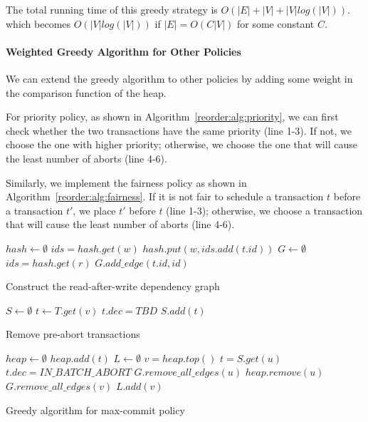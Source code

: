 The total running time of this greedy strategy is $O(|E|+|V|+|V|log(|V|))$. 
which becomes $O(|V|log(|V|))$ if $|E|=O(C|V|)$ for some constant $C$.

\paragraph{Weighted Greedy Algorithm for Other Policies}
We can extend the greedy algorithm to other policies by adding some weight in the comparison function of the heap.

For priority policy, as shown in Algorithm~\ref{reorder:alg:priority}, we can first check whether the two transactions have the same priority (line 1-3). 
If not, we choose the one with higher priority; otherwise, we choose the one that will cause the least number of aborts (line 4-6).

Similarly, we implement the fairness policy as shown in Algorithm~\ref{reorder:alg:fairness}. 
If it is not fair to schedule a transaction $t$ before a transaction $t'$, we place $t'$ before $t$ (line 1-3); otherwise, we choose a transaction that will cause the least number of aborts (line 4-6).

\begin{algorithm}
$hash \gets \emptyset$\;
 {
	 {
		$ids = hash.get(w)$\;
		$hash.put(w, ids.add(t.id))$\;
	}
}
$G\gets \emptyset$\;
 {
	 {
		$ids = hash.get(r)$\;
		 {
			$G.add\_edge(t.id, id)$\;
		}
	}
}
\;
\caption{Construct the read-after-write dependency graph}
\label{reorder:alg:graph}
\end{algorithm}

\begin{algorithm}
$S \gets \emptyset$\;
 {
	$t\gets T.get(v)$\;
	 {
		$t.dec = TBD$\;
		$S.add(t)$\;
	}
}
\;
\caption{Remove pre-abort transactions}
\label{reorder:alg:pre_abort}
\end{algorithm}


\begin{algorithm}
$heap\gets \emptyset$\;
 {
	$heap.add(t)$\;
}
$L\gets \emptyset$\;
 {
	$v = heap.top()$\;
	 {
		$t = S.get(u)$\;
		 {
			$t.dec = IN\_BATCH\_ABORT$\;
			$G.remove\_all\_edges(u)$\;
			$heap.remove(u)$\;
		}
	}
	$G.remove\_all\_edges(v)$\;
	$L.add(v)$\;
}
\caption{Greedy algorithm for max-commit policy}
\label{reorder:alg:greedy}
\end{algorithm}

